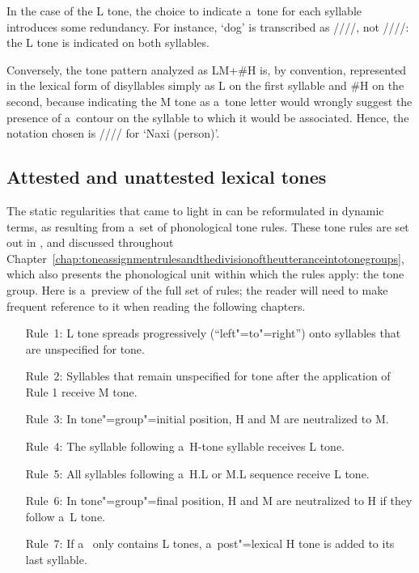 {{{{{In the case of the L tone, the choice to indicate a~tone for each syllable introduces some redundancy. For instance, ‘dog’ is transcribed
as ////, not ////: the L tone is indicated on both
syllables. 

Conversely, the tone pattern analyzed as LM+\#H is, by convention, represented in the lexical form
of disyllables simply as L on the first syllable and \#H on the second, because indicating the M
tone as a~tone letter would wrongly suggest the presence of a~contour on the syllable to which it
would be associated. Hence, the notation chosen is //// for ‘{Naxi} (person)’.


\subsection{Attested and unattested lexical tones}
\label{sec:attestedandunattestedlexicaltones}

The static regularities that came to light in  can be reformulated in dynamic terms, as resulting
from a~set of phonological tone rules. These tone rules are set out in , and discussed throughout Chapter~\ref{chap:toneassignmentrulesandthedivisionoftheutteranceintotonegroups}, which also presents the
phonological unit within which the rules apply: the {tone group}. Here is a~preview of the full set of rules; the reader will need to make frequent reference to it when reading the following chapters. 

\begin{enumerate}[leftmargin=2cm, itemsep=0pt, labelwidth=\widthof{Rule~1:}]%
	\item[Rule~1:] L tone spreads progressively (“left"=to"=right”) onto syllables that are unspecified for tone.
	\item[Rule~2:] Syllables that remain unspecified for tone after the application of Rule 1 receive M tone.
	\item[Rule~3:] In tone"=group"=initial position, H and M are neutralized to M.
	\item[Rule~4:] The syllable following a~H-tone syllable receives L tone.
	\item[Rule~5:] All syllables following a~H.L or M.L sequence receive L tone.
	\item[Rule~6:] In tone"=group"=final position, H and M are neutralized to H if they follow a~L tone.
	\item[Rule~7:] If a~ only contains L tones, a~post"=lexical H tone is added to its last syllable.
\end{enumerate}

}}}}}
